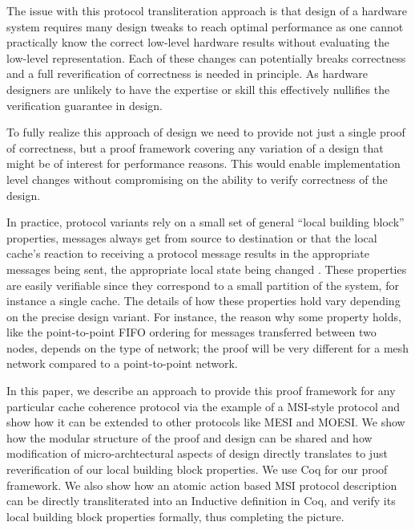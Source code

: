 The issue with this protocol transliteration approach is that design of a
hardware system requires many design tweaks to reach optimal performance as one
cannot practically know the correct low-level hardware results without
evaluating the low-level representation.
Each of these changes can potentially breaks
correctness and a full reverification of correctness is needed in
principle. As hardware designers are unlikely to have the expertise or
skill this effectively nullifies the verification guarantee in design.

To fully realize this approach of design we need to provide not just a
single proof of correctness, but a proof framework covering any
variation of a design that might be of interest for performance
reasons. This would enable implementation level changes without
compromising on the ability to verify correctness of the design.

In practice, protocol variants rely on a small set of general ``local building
block'' properties, \eg{} messages always get from source to destination or
that the local cache's reaction to receiving a protocol message results in the
appropriate messages being sent, the appropriate local state being changed \etc{}.
These properties are easily verifiable since they correspond to a small
partition of the system, for instance a single cache.
The details of how these properties hold vary depending on the precise design
variant. For instance, the reason why some property holds, like the
point-to-point FIFO ordering for messages transferred between two nodes,
depends on the type of network; the proof will be very different for a mesh
network compared to a point-to-point network.

In this paper, we describe an approach to provide this proof framework for any
particular cache coherence protocol via the example of a MSI-style protocol and
show how it can be extended to other protocols like MESI and MOESI. We show how
the modular structure of the proof and design can be shared and how
modification of micro-archtectural aspects of design directly translates to
just reverification of our local building block properties. We use Coq for our
proof framework. We also show how an atomic action based MSI protocol
description can be directly transliterated into an Inductive definition in Coq,
and verify its local building block properties formally, thus completing the
picture.
